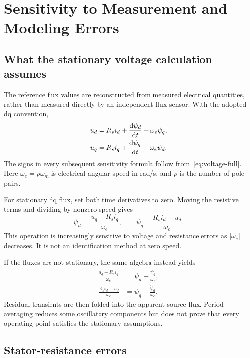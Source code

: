 \chapter{Sensitivity to Measurement and Modeling Errors}\label{ch:measurement}

\section{What the stationary voltage calculation assumes}
The reference flux values are reconstructed from measured electrical quantities, rather than measured directly by an independent flux sensor. With the adopted dq convention,
\begin{align}
u_d&=R_si_d+\frac{\mathrm d\psi_d}{\mathrm d t}-\omega_e\psi_q,\notag\\
u_q&=R_si_q+\frac{\mathrm d\psi_q}{\mathrm d t}+\omega_e\psi_d.
\label{eq:voltage-full}
\end{align}
The signs in every subsequent sensitivity formula follow from~\eqref{eq:voltage-full}. Here $\omega_e=p\omega_m$ is electrical angular speed in rad/s, and $p$ is the number of pole pairs.

For stationary dq flux, set both time derivatives to zero. Moving the resistive terms and dividing by nonzero speed gives
\begin{equation}\label{eq:stationary-flux}
\psi_d=\frac{u_q-R_si_q}{\omega_e},
\qquad
\psi_q=\frac{R_si_d-u_d}{\omega_e}.
\end{equation}
This operation is increasingly sensitive to voltage and resistance errors as $|\omega_e|$ decreases. It is not an identification method at zero speed.

If the fluxes are not stationary, the same algebra instead yields
\begin{align}
\frac{u_q-R_si_q}{\omega_e}
&=\psi_d+\frac{\dot\psi_q}{\omega_e},\\
\frac{R_si_d-u_d}{\omega_e}
&=\psi_q-\frac{\dot\psi_d}{\omega_e}.
\end{align}
Residual transients are then folded into the apparent source flux. Period averaging reduces some oscillatory components but does not prove that every operating point satisfies the stationary assumptions.

\section{Stator-resistance errors}
